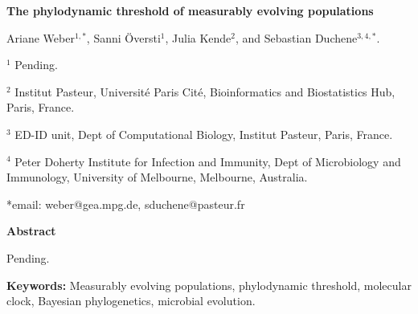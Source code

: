 \documentclass[11pt]{article}
\begin{document}
\begin{flushright}

\end{flushright}
\begin{center}
	\begin{LARGE}
	\textbf{The phylodynamic threshold of measurably evolving populations}
	\end{LARGE}

Ariane Weber$^{1,*}$, Sanni Översti$^{1}$, Julia Kende$^{2}$, and Sebastian Duchene$^{3,4,*}$.
\end{center}

$^{1}$ Pending.

$^{2}$ Institut Pasteur, Université Paris Cité, Bioinformatics and Biostatistics Hub, Paris, France.

$^{3}$ ED-ID unit, Dept of Computational Biology, Institut Pasteur, Paris, France.

$^{4}$ Peter Doherty Institute for Infection and Immunity, Dept of Microbiology and Immunology, University of Melbourne, Melbourne, Australia.


*email: weber@gea.mpg.de, sduchene@pasteur.fr

\begin{Large}
	\textbf{Abstract}
\end{Large}

Pending.

\textbf{Keywords:} Measurably evolving populations, phylodynamic threshold, molecular clock, Bayesian phylogenetics, microbial evolution.


\end{document}
